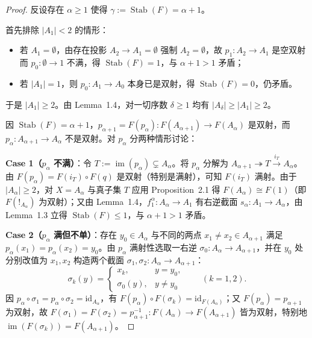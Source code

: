\documentclass[11pt,a4paper]{ctexart}
\theoremstyle{plain}
\newcommand{\Stab}{\operatorname{Stab}}
\newcommand{\im}{\operatorname{im}}
\newcommand{\id}{\mathrm{id}}
\begin{document}
\begin{proof}
反设存在 $\alpha \ge 1$ 使得 $\gamma := \Stab(F) = \alpha + 1$。

首先排除 $|A_1| < 2$ 的情形：
\begin{itemize}[leftmargin=2em]
  \item 若 $A_1 = \emptyset$，由存在投影 $A_2 \to A_1 = \emptyset$ 强制 $A_2 = \emptyset$，故 $p_1 : A_2 \to A_1$ 是空双射而 $p_0 : \emptyset \to 1$ 不满，得 $\Stab(F) = 1$，与 $\alpha + 1 > 1$ 矛盾；
  \item 若 $|A_1| = 1$，则 $p_0 : A_1 \to A_0$ 本身已是双射，得 $\Stab(F) = 0$，仍矛盾。
\end{itemize}
于是 $|A_1| \ge 2$。由 Lemma~1.4，对一切序数 $\delta \ge 1$ 均有 $|A_\delta| \ge |A_1| \ge 2$。

因 $\Stab(F) = \alpha + 1$，$p_{\alpha+1} = F(p_\alpha) : F(A_{\alpha+1}) \to F(A_\alpha)$ 是双射，而 $p_\alpha : A_{\alpha+1} \to A_\alpha$ 不是双射。对 $p_\alpha$ 分两种情形讨论：

\textbf{Case 1（$p_\alpha$ 不满）}：令 $T := \im(p_\alpha) \subsetneq A_\alpha$。将 $p_\alpha$ 分解为 $A_{\alpha+1} \twoheadrightarrow T \xrightarrow{i_T} A_\alpha$。由 $F(p_\alpha) = F(i_T) \circ F(q)$ 是双射（特别是满射），可知 $F(i_T)$ 满射。由于 $|A_\alpha| \ge 2$，对 $X = A_\alpha$ 与真子集 $T$ 应用 Proposition~2.1 得 $F(A_\alpha) \cong F(1)$（即 $F({!}_{A_\alpha})$ 为双射）；又由 Lemma~1.4，$f_1^\alpha : A_\alpha \to A_1$ 有右逆截面 $s_\alpha : A_1 \to A_\alpha$，由 Lemma~1.3 立得 $\Stab(F) \le 1$，与 $\alpha + 1 > 1$ 矛盾。

\textbf{Case 2（$p_\alpha$ 满但不单）}：存在 $y_0 \in A_\alpha$ 与不同的两点 $x_1 \neq x_2 \in A_{\alpha+1}$ 满足 $p_\alpha(x_1) = p_\alpha(x_2) = y_0$。由 $p_\alpha$ 满射性选取一右逆 $\sigma_0 : A_\alpha \to A_{\alpha+1}$，并在 $y_0$ 处分别改值为 $x_1, x_2$ 构造两个截面 $\sigma_1, \sigma_2 : A_\alpha \to A_{\alpha+1}$：
\[
  \sigma_k(y) = \begin{cases} x_k, & y = y_0, \\ \sigma_0(y), & y \neq y_0 \end{cases}
  \qquad (k = 1, 2).
\]
因 $p_\alpha \circ \sigma_1 = p_\alpha \circ \sigma_2 = \id_{A_\alpha}$，有 $F(p_\alpha) \circ F(\sigma_k) = \id_{F(A_\alpha)}$；又 $F(p_\alpha) = p_{\alpha+1}$ 为双射，故 $F(\sigma_1) = F(\sigma_2) = p_{\alpha+1}^{-1} : F(A_\alpha) \to F(A_{\alpha+1})$ 皆为双射，特别地 $\im(F(\sigma_k)) = F(A_{\alpha+1})$。


\end{proof}
\end{document}
